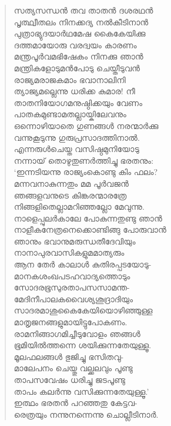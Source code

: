 \begin{verse}
സത്യസന്ധന്‍ തവ താതന്‍ ദശരഥന്‍\\
പൃത്ഥ്വീതലം നിനക്കദ്യ നല്‍കീടിനാന്‍\\
പുത്രാഭ്യുദയാര്‍ഥമേഷ കൈകേയിക്കു\\
ദത്തമായോരു വരദ്വയം കാരണം\\
മന്ത്രപൂര്‍വമഭിഷേകം നിനക്കു ഞാന്‍\\
മന്ത്രികളോടുമന്‍പോടു ചെയ്തീടുവന്‍\\
രാജ്യമരാജകമാം ഭവാനാലിനി\\
ത്യാജ്യമല്ലെന്നു ധരിക്ക കുമാര! നീ\\
താതനിയോഗമനുഷ്ഠിക്കയും വേണം\\
പാതകമുണ്ടാമതല്ലായ്കിലേവനും\\
ഒന്നൊഴിയാതെ ഗുണങ്ങള്‍ നരന്മാര്‍ക്കു\\
വന്നുകൂടുന്നു ഗുരുപ്രസാദത്തിനാല്‍.\\
എന്നരുള്‍ചെയ്ത വസിഷ്ഠമുനിയോടു\\
നന്നായ് തൊഴുതുണര്‍ത്തിച്ചു ഭരതനും:\\
‘ഇന്നടിയന്നു രാജ്യംകൊണ്ടു കിം ഫലം?\\
മന്നവനാകുന്നതും മമ പൂര്‍വജന്‍\\
ഞങ്ങളവനുടെ കിങ്കരന്മാരത്രേ\\
നിങ്ങളിതെല്ലാമറിഞ്ഞല്ലോ മേവുന്നു.\\
നാളെപ്പുലര്‍കാലേ പോകുന്നതുണ്ടു ഞാന്‍\\
നാളീകനേത്രനെക്കൊണ്ടിങ്ങു പോരുവാന്‍\\
ഞാനും ഭവാനുമരുന്ധതീദേവിയും\\
നാനാപുരവാസികളുമമാത്യരും\\
ആന തേര്‍ കാലാള്‍ കുതിരപ്പടയോടു-\\
മാനകശംഖപടഹവാദ്യത്തൊടും\\
സോദരഭൂസുരതാപസസാമന്ത-\\
മേദിനീപാലകവൈശ്യശൂദ്രാദിയും\\
സാദരമാശുകൈകേയിയൊഴിഞ്ഞുള്ള\\
മാതൃജനങ്ങളുമായിട്ടുപോകണം.\\
രാമനിങ്ങാഗമിച്ചീടുവോളം ഞങ്ങള്‍\\
ഭൂമിയില്‍ത്തന്നെ ശയിക്കുന്നതേയുള്ളൂ.\\
മൂലഫലങ്ങള്‍ ഭുജിച്ചു ഭസിതവു-\\
മാലേപനം ചെയ്തു വല്ക്കലവും പൂണ്ടു\\
താപസവേഷം ധരിച്ചു ജടപൂണ്ടു\\
താപം കലര്‍ന്നു വസിക്കുന്നതേയുള്ളൂ.’\\
ഇത്ഥം ഭരതന്‍ പറഞ്ഞതു കേട്ടവ-\\
രെത്രയും നന്നുനന്നെന്നു ചൊല്ലീടിനാര്‍.
\end{verse}

